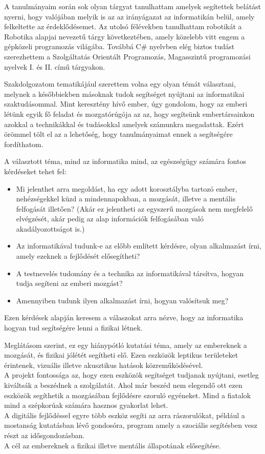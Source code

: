 \documentclass[tocnopagenum]{thesis-ekf}
\theoremstyle{definition}
\theoremstyle{remark}
\begin{document}
	A tanulmányaim során sok olyan tárgyat tanulhattam amelyek segítettek belátást nyerni, hogy valójában melyik is az az irányágazat az informatikán belül, amely felkeltette az érdeklődésemet. Az utolsó félévekben tanulhattam robotikát a Robotika alapjai nevezetű tárgy következtében, amely közelebb vitt engem a gépközeli programozás világába. Továbbá C\# nyelvben elég biztos tudást szerezhettem a Szolgáltatás Orientált Programozás, Magasszintű programozási nyelvek I. és II. című tárgyakon.
	\par
	Szakdolgozatom tematikájául szerettem volna egy olyan témát választani, melynek a későbbiekben másoknak tudok segítséget nyújtani az informatikai szaktudásommal.
	Mint keresztény hívő ember, úgy gondolom, hogy az emberi létünk egyik fő feladat és mozgatórúgója az az, hogy segítsünk embertársainkon azokkal a technikákkal és tudásokkal amelyek számunkra megadattak. Ezért örömmel tölt el az a lehetőség, hogy tanulmányaimat ennek a segítségére fordíthatom. 
	\par
	A választott téma, mind az informatika mind, az egészségügy számára fontos kérdéseket tehet fel:
	\begin{itemize}
		\item  Mi jelenthet arra megoldást, ha egy adott korosztályba tartozó ember, nehézségekkel küzd a mindennapokban, a mozgását, illetve a mentális felfogását illetően? (Akár ez jelentheti az egyszerű mozgások nem megfelelő elvégzését, akár pedig az alap információk felfogásában való akadályozottságot is.)
		\item  Az informatikával tudunk-e az előbb említett kérdésre, olyan alkalmazást írni, amely ezeknek a fejlődését elősegítheti?
		\item A testnevelés tudomány és a technika az informatikával társítva, hogyan tudja segíteni az emberi mozgást?
		\item Amennyiben tudunk ilyen alkalmazást írni, hogyan valósítsuk meg?
	
	\end{itemize}
 	Ezen kérdések alapján keresem a válaszokat arra nézve, hogy az informatika hogyan tud segítségére lenni a fizikai létnek. 
 
	Meglátásom szerint, ez egy hiánypótló kutatási téma, amely az embereknek a mozgását, és fizikai jólétét segítheti elő.
	Ezen eszközök leptikus területeket érintenek, vizuális illetve akusztikus hatások közreműködésével.
	\\
	A projekt fontossága az, hogy ezen eszközök segítséget tudjanak nyújtani, esetleg kiváltsák a beszédnek a szolgálatát. Ahol már beszéd nem elegendő ott ezen eszközök segíthetik a mozgásában fejlődésre szoruló egyéneket. Mind a fiatalok mind a szépkorúak számára hasznos gyakorlat lehet.
	\\ 
	A digitális fejlődéssel egyre több eszköz segíti az arra rászorulókat, például a mostanság kutatásban lévő gondosóra, program amely a szociális segítésben vesz részt az idősgondozásban.\cite{MTI}
	\\
	A cél az embereknek a fizikai illetve mentális állapotának elősegítése.
	\par 
	
\end{document}
